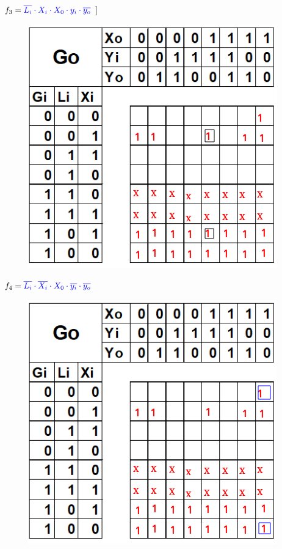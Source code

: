 \documentclass[12pt,letterpaper]{book}
\begin{document}
\begin{multicols}{2}
$f_3=\textcolor{blue}{\overline{L_i} \cdot X_i \cdot X_0\cdot y_i \cdot \overline{y_o}}$
]
\begin{figure}[H]
\centering
\includegraphics[width=1\linewidth]{figures/k4.png}
\caption{}
\label{k4}
\end{figure}
\vspace{0.2cm}


$f_4=\textcolor{blue}{\overline{L_i} \cdot \overline{X_i} \cdot X_0\cdot \overline{y_i}  \cdot \overline{y_o}}$

\begin{figure}[H]
\centering
\includegraphics[width=1\linewidth]{figures/k5.png}
\caption{}
\label{k5}
\end{figure}
\vspace{0.2cm}


\end{multicols}
\end{document}

